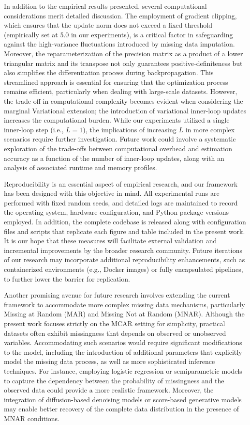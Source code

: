 \documentclass{article} %
\begin{document}
In addition to the empirical results presented, several computational considerations merit detailed discussion. The employment of gradient clipping, which ensures that the update norm does not exceed a fixed threshold (empirically set at 5.0 in our experiments), is a critical factor in safeguarding against the high-variance fluctuations introduced by missing data imputation. Moreover, the reparameterization of the precision matrix as a product of a lower triangular matrix and its transpose not only guarantees positive-definiteness but also simplifies the differentiation process during backpropagation. This streamlined approach is essential for ensuring that the optimization process remains efficient, particularly when dealing with large-scale datasets. However, the trade-off in computational complexity becomes evident when considering the marginal Variational extension; the introduction of variational inner-loop updates increases the computational burden. While our experiments utilized a single inner-loop step (i.e., \(L=1\)), the implications of increasing \(L\) in more complex scenarios require further investigation. Future work could involve a systematic exploration of the trade-offs between computational overhead and estimation accuracy as a function of the number of inner-loop updates, along with an analysis of associated runtime and memory profiles.

Reproducibility is an essential aspect of empirical research, and our framework has been designed with this objective in mind. All experimental runs are performed with fixed random seeds, and detailed logs are maintained to record the operating system, hardware configuration, and Python package versions employed. In addition, the complete codebase is released along with configuration files and scripts that replicate each figure and table included in the present work. It is our hope that these measures will facilitate external validation and incremental improvements by the broader research community. Future iterations of our research may incorporate additional reproducibility enhancements, such as containerized environments (e.g., Docker images) or fully encapsulated pipelines, to further lower the barrier for replication.

Another promising avenue for future research involves extending the current framework to accommodate more complex missing data mechanisms, particularly Missing at Random (MAR) and Missing Not at Random (MNAR). Although the present work focuses strictly on the MCAR setting for simplicity, practical datasets often exhibit missingness that depends on observed or unobserved variables. Accommodating such scenarios would require significant modifications to the model, including the introduction of additional parameters that explicitly model the missing data process, as well as more sophisticated inference techniques. For instance, employing logistic regression or semiparametric models to capture the dependency between the probability of missingness and the observed data could provide a more realistic framework. Moreover, the integration of diffusion-based denoising models or score-based generative models may enable better recovery of the complete data distribution in the presence of MNAR conditions.
\end{document}
